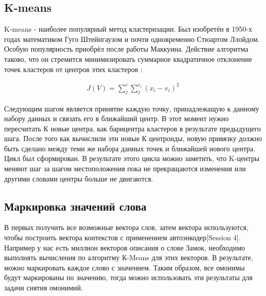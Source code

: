 \documentclass[12pt]{article}
\begin{document}
\subsection{K-means}

K-means - наиболее популярный метод кластеризации. Был изобретён в 1950-х годах математиком Гуго Штейнгаузом и почти одновременно Стюартом Ллойдом. Особую популярность приобрёл после работы Маккуина. Действие алгоритма таково, что он стремится минимизировать суммарное квадратичное отклонение точек кластеров от центров этих кластеров \cite{kmeans}:

	\begin{align}
		J(V) = \sum_{j}^{c}\sum_{j}^{c_i}(x_i-v_i)^2
	\end{align}

Следующим шагом является принятие каждую точку, принадлежащую к данному набору данных и связать его в ближайший центр. В этот момент нужно пересчитать К новые центра, как барицентра кластеров в результате предыдущего шага. После того как вычислили эти новые К центроиды, новую привязку должно быть сделано между теми же набора данных точек и ближайшей нового центра. Цикл был сформирован. В результате этого цикла можно заметить, что K-центры меняют шаг за шагом местоположения пока не прекращаются изменения или другими словами центры больше не двигаются.

\subsection{Маркировка значений слова}

В первых получить все возможные вектора слов, затем вектора используются, чтобы построить вектора контекстов с применением автоэнкодер[Session 4]. Например у нас есть миллион векторов описания о слове Замок, необходимо выполнять вычисления по алгоритму К-Means для этих векторов. В результате, можно маркировать каждое слово с  значением. Таким образом, все омонимы будут маркированы по значению, тогда можно использовать эти результаты для задачи снятия омонимий. 
\end{document}

